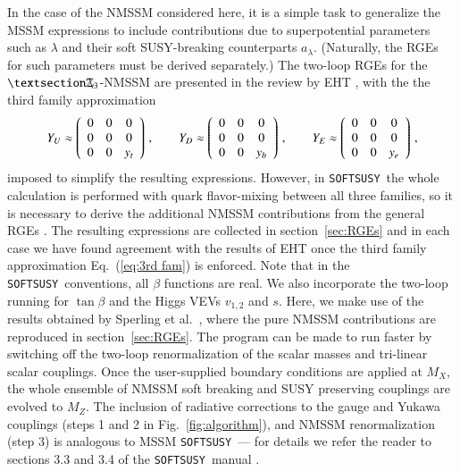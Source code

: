 \documentclass[final,3p,times,pdflatex]{elsarticle}
\def\SOFTSUSY{{\tt SOFTSUSY}}
\newcommand{\Zv}{\,\mathbf{\backslash}\mkern-11.0mu{\mathbb{Z}}_{3}} %
\begin{document}
In the case of the NMSSM considered here, it is a simple task to generalize the 
MSSM expressions \cite{MV94} to include contributions due to superpotential 
parameters such as $\lambda$ and their soft SUSY-breaking counterparts 
$a_\lambda$.  (Naturally, the RGEs for such parameters must be derived 
separately.)  The two-loop RGEs for the $§\Zv$-NMSSM are presented in the review by EHT \cite{Ellwanger:2009dp}, with the 
the third family approximation
%
\begin{equation}
Y_U \approx \left(\begin{array}{c c c} 
0 & 0 & 0 \\
0 & 0 & 0 \\
0 & 0 & y_t 
\end{array}\right) \,, \qquad
%
Y_D \approx \left(\begin{array}{c c c} 
0 & 0 & 0 \\
0 & 0 & 0 \\
0 & 0 & y_b 
\end{array}\right) \,, \qquad
%
Y_E \approx \left(\begin{array}{c c c} 
0 & 0 & 0 \\
0 & 0 & 0 \\
0 & 0 & y_e 
\end{array}\right)\,,
\label{eq:3rd fam} 
\end{equation}
%
imposed to simplify the resulting expressions.
However, in \SOFTSUSY~the whole calculation is performed with quark 
flavor-mixing between all three families, so it is necessary to derive the 
additional NMSSM contributions from the general RGEs \cite{MV94,Yam94}.  The 
resulting expressions are collected in section~\ref{sec:RGEs} and in each case we have 
found agreement with the results of EHT \cite{Ellwanger:2009dp} once the third 
family approximation Eq.~(\ref{eq:3rd fam}) is enforced.  Note that in the 
\SOFTSUSY~conventions, all $\beta$ functions are real.
We also incorporate the two-loop running for $\tan\beta$ and the Higgs VEVs  
$v_{1,2}$ and $s$.  Here, we make use of the results obtained by 
Sperling et al.\ \cite{Sper13,Sper13-2}, where the pure   NMSSM contributions 
are reproduced in section~\ref{sec:RGEs}.
The program can be made to run faster by switching off the two-loop
 renormalization of the scalar masses and tri-linear scalar couplings.
Once the user-supplied boundary conditions are applied at $M_X$, the whole 
ensemble of NMSSM soft breaking and SUSY preserving couplings are evolved to 
$M_Z$. The inclusion of radiative corrections to the gauge and Yukawa couplings 
(steps 1 and 2 in Fig.~\ref{fig:algorithm}), and NMSSM renormalization (step 3)
 is analogous to MSSM \SOFTSUSY~--- for details we refer the reader to sections
3.3 and 3.4 of the \SOFTSUSY~manual \cite{Allanach:2001kg}.
\end{document}
